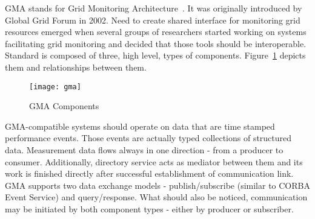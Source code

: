 GMA stands for Grid Monitoring Architecture~\cite{GMA1,GMA2}. It was originally introduced by Global Grid Forum in 2002. Need to create shared interface for monitoring grid resources emerged when several groups of researchers started working on systems facilitating grid monitoring and decided that those tools should be interoperable. Standard is composed of three, high level, types of components. Figure~\ref{fig:gma} depicts them and relationships between them.

\begin{figure}[ht]
	\centering
	\texttt{[image: gma]}
	\caption{GMA Components}
	\label{fig:gma}
\end{figure}

GMA-compatible systems should operate on data that are time stamped performance events. Those events are actually typed collections of structured data. Measurement data flows always in one direction - from a producer to consumer. Additionally, directory service acts as mediator between them and its work is finished directly after successful establishment of communication link. GMA supports two data exchange models - publish/subscribe (similar to CORBA Event Service) and query/response. What should also be noticed, communication may be initiated by both component types - either by producer or subscriber.
